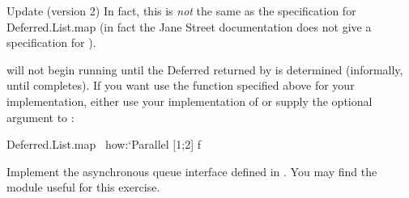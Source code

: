 \documentclass{pset}
\begin{document}
\begin{note}{Update (version 2)}
\label{update:deferred_map}
In fact, this is \emph{not} the same as the specification for Deferred.List.map
(in fact the Jane Street documentation does not give a specification for
).

 will not begin running  until the 
Deferred returned by  is determined (informally, until 
completes).  If you want use the function specified above for your
implementation, either use your implementation of  or supply
the optional argument  to :
\begin{ocaml}
Deferred.List.map ~how:`Parallel [1;2] f
\end{ocaml}
\end{note}

\exercise{}

Implement the asynchronous queue interface defined in .
You may find the  module useful for this exercise.
\end{document}
